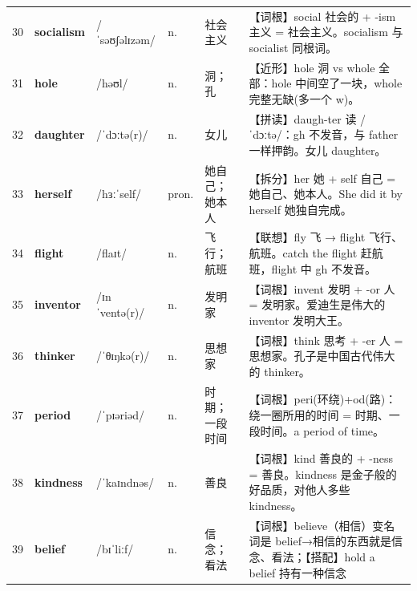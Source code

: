 \documentclass[UTF8,a4paper,11pt,oneside]{ctexbook}
\newcommand{\cellword}[1]{{\bfseries\textcolor{wordcol}{#1}}}
\newcommand{\cellipa}[1]{{\footnotesize\textcolor{ipacol}{#1}}}
\newcommand{\cellpos}[1]{\textcolor{poscol}{#1}}
\newcommand{\cellno}[1]{\textcolor{volcolor!75!black}{#1}}
\begin{document}
{\begin{longtable}{@{}C{0.045\textwidth}L{0.155\textwidth}L{0.175\textwidth}C{0.070\textwidth}L{0.180\textwidth}L{0.282\textwidth}@{}}
\cellno{30} & \cellword{socialism} & \cellipa{/ˈsəʊʃəlɪzəm/} & \cellpos{n.} & 社会主义 & \textcolor{tagRoot}{【词根】}social 社会的 + -ism 主义 = 社会主义。socialism 与 socialist 同根词。 \\
 \cellno{31} & \cellword{hole} & \cellipa{/həʊl/} & \cellpos{n.} & 洞；孔 & \textcolor{tagNear}{【近形】}hole 洞 vs whole 全部：hole 中间空了一块，whole 完整无缺(多一个 w)。 \\
\cellno{32} & \cellword{daughter} & \cellipa{/ˈdɔːtə(r)/} & \cellpos{n.} & 女儿 & \textcolor{tagSpell}{【拼读】}daugh-ter 读 /ˈdɔːtə/：gh 不发音，与 father 一样押韵。女儿 daughter。 \\
 \cellno{33} & \cellword{herself} & \cellipa{/hɜːˈself/} & \cellpos{pron.} & 她自己；她本人 & \textcolor{tagSplit}{【拆分】}her 她 + self 自己 = 她自己、她本人。She did it by herself 她独自完成。 \\
\cellno{34} & \cellword{flight} & \cellipa{/flaɪt/} & \cellpos{n.} & 飞行；航班 & \textcolor{tagAssoc}{【联想】}fly 飞 →\allowbreak{} flight 飞行、航班。catch the flight 赶航班，flight 中 gh 不发音。 \\
 \cellno{35} & \cellword{inventor} & \cellipa{/ɪnˈventə(r)/} & \cellpos{n.} & 发明家 & \textcolor{tagRoot}{【词根】}invent 发明 + -or 人 = 发明家。爱迪生是伟大的 inventor 发明大王。 \\
\cellno{36} & \cellword{thinker} & \cellipa{/ˈθɪŋkə(r)/} & \cellpos{n.} & 思想家 & \textcolor{tagRoot}{【词根】}think 思考 + -er 人 = 思想家。孔子是中国古代伟大的 thinker。 \\
 \cellno{37} & \cellword{period} & \cellipa{/ˈpɪəriəd/} & \cellpos{n.} & 时期；一段时间 & \textcolor{tagRoot}{【词根】}peri(环绕)+od(路)：绕一圈所用的时间 = 时期、一段时间。a period of time。 \\
\cellno{38} & \cellword{kindness} & \cellipa{/ˈkaɪndnəs/} & \cellpos{n.} & 善良 & \textcolor{tagRoot}{【词根】}kind 善良的 + -ness = 善良。kindness 是金子般的好品质，对他人多些 kindness。 \\
 \cellno{39} & \cellword{belief} & \cellipa{/bɪˈliːf/} & \cellpos{n.} & 信念；看法 & \textcolor{tagRoot}{【词根】}believe（相信）变名词是 belief→\allowbreak{}相信的东西就是信念、看法；\textcolor{tagColloc}{【搭配】}hold a belief 持有一种信念 \\
\end{longtable}
}

\end{document}
